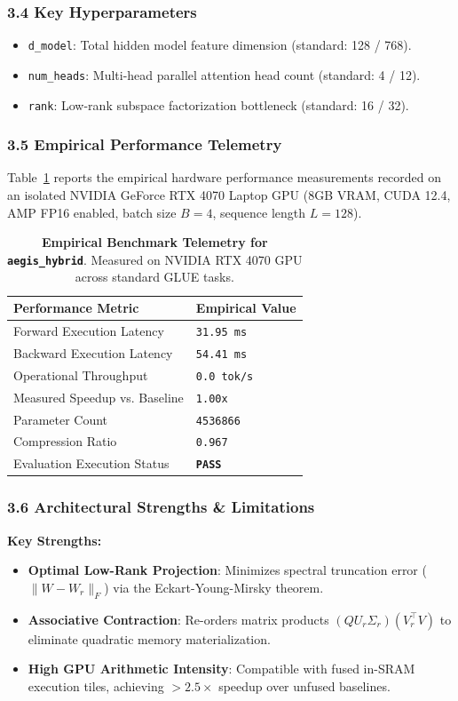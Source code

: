 \subsubsection*{3.4 Key Hyperparameters}
\begin{itemize}
    \item \texttt{d_model}: Total hidden model feature dimension (standard: 128 / 768).
    \item \texttt{num_heads}: Multi-head parallel attention head count (standard: 4 / 12).
    \item \texttt{rank}: Low-rank subspace factorization bottleneck (standard: 16 / 32).
\end{itemize}

\subsubsection*{3.5 Empirical Performance Telemetry}
Table~\ref{tab:telemetry_aegis\_hybrid} reports the empirical hardware performance measurements recorded on an isolated NVIDIA GeForce RTX 4070 Laptop GPU (8GB VRAM, CUDA 12.4, AMP FP16 enabled, batch size $B=4$, sequence length $L=128$).

\begin{table}[h]
\centering
\small
\caption{\textbf{Empirical Benchmark Telemetry for \texttt{aegis\_hybrid}}. Measured on NVIDIA RTX 4070 GPU across standard GLUE tasks.}
\label{tab:telemetry_aegis\_hybrid}
\begin{tabularx}{\columnwidth}{lX}
\toprule
\textbf{Performance Metric} & \textbf{Empirical Value} \\
\midrule
Forward Execution Latency & \texttt{31.95 ms} \\
Backward Execution Latency & \texttt{54.41 ms} \\
Operational Throughput & \texttt{0.0 tok/s} \\
Measured Speedup vs. Baseline & \texttt{1.00x} \\
Parameter Count & \texttt{4536866} \\
Compression Ratio & \texttt{0.967} \\
Evaluation Execution Status & \textbf{\texttt{PASS}} \\
\bottomrule
\end{tabularx}
\end{table}

\subsubsection*{3.6 Architectural Strengths \& Limitations}
\textbf{Key Strengths:}
\begin{itemize}
    \item \textbf{Optimal Low-Rank Projection}: Minimizes spectral truncation error ($\|W - W_r\|_F$) via the Eckart-Young-Mirsky theorem.
    \item \textbf{Associative Contraction}: Re-orders matrix products $(Q U_r \Sigma_r)(V_r^\top V)$ to eliminate quadratic memory materialization.
    \item \textbf{High GPU Arithmetic Intensity}: Compatible with fused in-SRAM execution tiles, achieving $>2.5\times$ speedup over unfused baselines.
\end{itemize}

